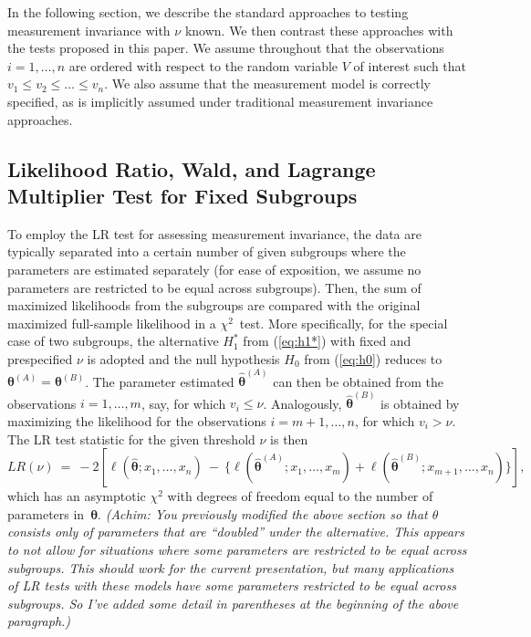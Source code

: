 \documentclass[man]{apa}
\newcommand{\readme}[1]{\emph{\marginpar{README} (#1)}}
\begin{document}
In the following section, we describe the standard approaches to
testing measurement invariance with $\nu$ known.  We then contrast
these approaches with the tests proposed in this paper.
We assume throughout that the observations $i = 1, \dots, n$ are
ordered with respect to the random variable $V$ of interest such that
$v_1 \le v_2 \le \dots \le v_n$.  We also assume that the measurement
model is correctly specified, as is implicitly assumed under traditional
measurement invariance approaches.


\subsection{Likelihood Ratio, Wald, and Lagrange Multiplier Test for Fixed Subgroups}

To employ the LR test for assessing measurement invariance, the data
are typically separated into a certain number of given subgroups where
the parameters are estimated separately (for ease of
  exposition, we assume no parameters are restricted to be equal
  across subgroups). Then, the sum of maximized likelihoods 
from the subgroups are compared with the original maximized full-sample likelihood
in a $\chi^2$~test. More specifically, for the special case of two subgroups,
the alternative $H_1^*$ from (\ref{eq:h1*}) with fixed and prespecified $\nu$ is adopted
and the null hypothesis $H_0$ from (\ref{eq:h0}) reduces to ${\bm \theta}^{(A)} = {\bm \theta}^{(B)}$.
The parameter estimated $\hat {\bm \theta}^{(A)}$ can then be obtained from the
observations $i = 1, \dots, m$, say, for which $v_i \le \nu$. Analogously,
$\hat {\bm \theta}^{(B)}$ is obtained by maximizing the likelihood for the
observations $i = m + 1, \dots, n$, for which $v_i > \nu$. The LR test statistic
for the given threshold $\nu$ is then
\begin{equation} \label{eq:lr}
  \mathit{LR}(\nu) ~=~ -2 \left[
         \ell(\hat {\bm \theta}; x_1, \dots, x_n)
   ~-~ \{\ell(\hat {\bm \theta}^{(A)}; x_1, \dots, x_m)
    +    \ell(\hat {\bm \theta}^{(B)}; x_{m+1}, \dots, x_n)\}
    \right],
\end{equation}
which has an asymptotic $\chi^2$ with degrees of freedom equal to the number
of parameters in~${\bm \theta}$.
\readme{Achim: You previously modified the above section so that $\theta$
  consists only of parameters that are ``doubled'' under the
  alternative.  This appears to not allow for situations where some 
  parameters are restricted to be equal across subgroups.  This should
  work for the current presentation, 
  but many applications of LR tests with these models have
  some parameters restricted to be equal across subgroups.  So I've
  added some detail in parentheses at the beginning of the above
  paragraph.}
\end{document}
